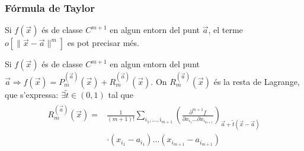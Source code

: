 \subsubsection*{Fórmula de Taylor}
Si $f(\vec{x})$ és de classe $C^{m+1}$ en algun entorn del punt $\vec{a}$, el terme $o[\| \vec{x} - \vec{a} \|^{m}]$ es pot precisar més. 
\begin{thm}
    Si $f(\vec{x})$ és de classe $C^{m+1}$ en algun entorn del punt $\vec{a} \Rightarrow f(\vec{x}) = P_{m}^{(\vec{a})}(\vec{x}) + R_{m}^{(\vec{a})}(\vec{x})$. On $R_{m}^{(\vec{a})}(\vec{x})$ és la resta de Lagrange, que s'expressa: $\exists \tilde{t} \in (0,1)$ tal que 
    \begin{align}
        \begin{aligned}
            R_{m}^{(\vec{a})}(\vec{x}) = & \frac{1}{(m+1)!} \sum_{i_{1}, \dots, i_{m+1}} \left( \frac{\partial^{m+1} f}{\partial x_{i_{1}} \dots \partial x_{i_{m+1}}} \right)_{\vec{a} + \tilde{t} (\vec{x} - \vec{a}) } \\
            & \cdot (x_{i_{1}} - a_{i_{1}}) \dots (x_{i_{m+1}} - a_{i_{m+1}})
        \end{aligned}
    \end{align}
\end{thm}

